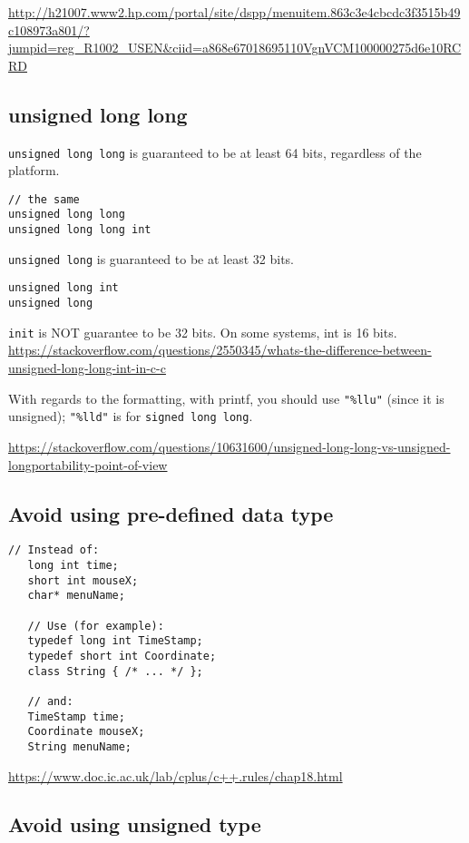 \url{http://h21007.www2.hp.com/portal/site/dspp/menuitem.863c3e4cbcdc3f3515b49c108973a801/?jumpid=reg_R1002_USEN&ciid=a868e67018695110VgnVCM100000275d6e10RCRD}

\subsection{unsigned long long}


\verb!unsigned long long! is guaranteed to be at least 64 bits, regardless of the platform.
\begin{verbatim}
// the same
unsigned long long
unsigned long long int
\end{verbatim}

\verb!unsigned long! is guaranteed to be at least 32 bits.
\begin{verbatim}
unsigned long int
unsigned long 
\end{verbatim}

\verb!init! is NOT guarantee to be 32 bits. On some systems, int is 16 bits. 
\url{https://stackoverflow.com/questions/2550345/whats-the-difference-between-unsigned-long-long-int-in-c-c}


With regards to the formatting, with printf, you should use \verb!"%llu"! (since
it is unsigned); \verb!"%lld"! is for 
\verb!signed long long!.



\url{https://stackoverflow.com/questions/10631600/unsigned-long-long-vs-unsigned-longportability-point-of-view}



\subsection{Avoid using pre-defined data type}

\begin{Verbatim}
// Instead of:
   long int time;
   short int mouseX;
   char* menuName;
   
   // Use (for example):
   typedef long int TimeStamp;
   typedef short int Coordinate;
   class String { /* ... */ };
   
   // and:
   TimeStamp time;
   Coordinate mouseX;
   String menuName;
\end{Verbatim}
\url{https://www.doc.ic.ac.uk/lab/cplus/c++.rules/chap18.html}

\subsection{Avoid using unsigned type}

